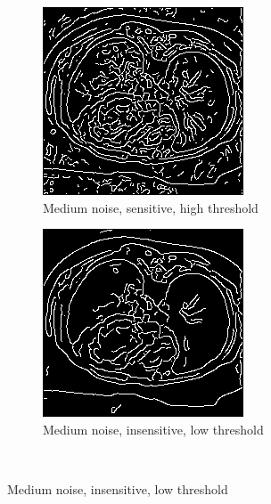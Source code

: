 \begin{figure}[H]
  \begin{subfigure}{.5\textwidth}
    \centering
    \includegraphics[width=.9\textwidth]{./edgedetection/medium_noise/m_noise_sens_h_thres}
    \caption{Medium noise, sensitive, high threshold}
    \label{fig:m_noise_sens_h_thres}
  \end{subfigure}%
  
  \begin{subfigure}{.5\textwidth}
    \centering
    \includegraphics[width=.9\textwidth]{./edgedetection/medium_noise/m_noise_insens_l_thres}
    \caption{Medium noise, insensitive, low threshold}
    \label{fig:m_noise_insens_l_thres}
  \end{subfigure}\\%
  

\end{figure}
